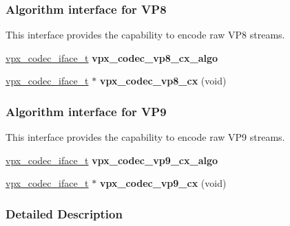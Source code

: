 \subsubsection*{Algorithm interface for V\+P8}
\label{_amgrp0b829b38ff2e659173b35cd78e0735bd}%
This interface provides the capability to encode raw V\+P8 streams. \begin{DoxyCompactItemize}
\item 
\hyperlink{group__codec_gae99c3b04f4a567a311211cce3ae6b83b}{vpx\+\_\+codec\+\_\+iface\+\_\+t} {\bfseries vpx\+\_\+codec\+\_\+vp8\+\_\+cx\+\_\+algo}\hypertarget{group__vp8__encoder_ga689ede372ab835c8e1c9631f17b47eb5}{}\label{group__vp8__encoder_ga689ede372ab835c8e1c9631f17b47eb5}

\item 
\hyperlink{group__codec_gae99c3b04f4a567a311211cce3ae6b83b}{vpx\+\_\+codec\+\_\+iface\+\_\+t} $\ast$ {\bfseries vpx\+\_\+codec\+\_\+vp8\+\_\+cx} (void)\hypertarget{group__vp8__encoder_ga1b5362d0d5b5a2d50f173f9c160fad9f}{}\label{group__vp8__encoder_ga1b5362d0d5b5a2d50f173f9c160fad9f}

\end{DoxyCompactItemize}
\subsubsection*{Algorithm interface for V\+P9}
\label{_amgrp9a787aae8f239d3b1cb9aeff16fb31ef}%
This interface provides the capability to encode raw V\+P9 streams. \begin{DoxyCompactItemize}
\item 
\hyperlink{group__codec_gae99c3b04f4a567a311211cce3ae6b83b}{vpx\+\_\+codec\+\_\+iface\+\_\+t} {\bfseries vpx\+\_\+codec\+\_\+vp9\+\_\+cx\+\_\+algo}\hypertarget{group__vp8__encoder_ga2d01224b7a5b2a1ecf538493b3089d0f}{}\label{group__vp8__encoder_ga2d01224b7a5b2a1ecf538493b3089d0f}

\item 
\hyperlink{group__codec_gae99c3b04f4a567a311211cce3ae6b83b}{vpx\+\_\+codec\+\_\+iface\+\_\+t} $\ast$ {\bfseries vpx\+\_\+codec\+\_\+vp9\+\_\+cx} (void)\hypertarget{group__vp8__encoder_ga3fdeb42af524ef0f07695aab8d95ae2c}{}\label{group__vp8__encoder_ga3fdeb42af524ef0f07695aab8d95ae2c}

\end{DoxyCompactItemize}


\subsubsection{Detailed Description}


